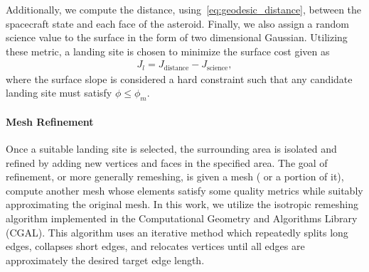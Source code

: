 \documentclass[letterpaper, paper,11pt]{AAS}		%
\begin{document}
Additionally, we compute the distance, using~\cref{eq:geodesic_distance}, between the spacecraft state and each face of the asteroid. 
Finally, we also assign a random science value to the surface in the form of two dimensional Gaussian.
Utilizing these metric, a landing site is chosen to minimize the surface cost given as
\begin{align}\label{eq:surface_cost}
    J_l =  J_{\text{distance}} - J_{\text{science}},
\end{align}
where the surface slope is considered a hard constraint such that any candidate landing site must satisfy \( \phi \leq \phi_m \).

\paragraph{Mesh Refinement}\label{sec:refinement}

Once a suitable landing site is selected, the surrounding area is isolated and refined by adding new vertices and faces in the specified area.
The goal of refinement, or more generally remeshing, is given a mesh ( or a portion of it), compute another mesh whose elements satisfy some quality metrics while suitably approximating the original mesh.
In this work, we utilize the isotropic remeshing algorithm implemented in the Computational Geometry and Algorithms Library (CGAL).
This algorithm uses an iterative method which repeatedly splits long edges, collapses short edges, and relocates vertices until all edges are approximately the desired target edge length.
\end{document}
